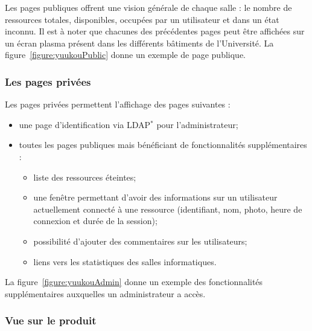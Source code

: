 \vspace{0.20cm}

Les pages publiques offrent une vision g\'en\'erale de chaque salle : le nombre de ressources totales, disponibles, occup\'ees par un utilisateur et dans un \'etat inconnu.
Il est \`a noter que chacunes des pr\'ec\'edentes pages peut \^etre affich\'ees sur un \'ecran plasma pr\'esent dans les diff\'erents b\^atiments de l'Universit\'e.
La figure~\ref{figure:yuukouPublic} donne un exemple de page publique.

\subsubsection{Les pages priv\'ees}

\noindent Les pages priv\'ees permettent l'affichage des pages suivantes :

\begin{itemize}
	\item une page d'identification via LDAP$^*$ pour l'administrateur;
	\item toutes les pages publiques mais b\'en\'eficiant de fonctionnalit\'es suppl\'ementaires :

	\begin{itemize}
		\item liste des ressources \'eteintes;
		\item une fen\^etre permettant d'avoir des informations sur un utilisateur actuellement connect\'e \`a une ressource (identifiant, nom, photo, heure de connexion et dur\'ee de la session);
		\item possibilit\'e d'ajouter des commentaires sur les utilisateurs;
		\item liens vers les statistiques des salles informatiques.

	\end{itemize}

\end{itemize}

\vspace{0.20cm}

La figure~\ref{figure:yuukouAdmin} donne un exemple des fonctionnalit\'es suppl\'ementaires auxquelles un administrateur a acc\`es.

\clearpage

\subsubsection{Vue sur le produit}

